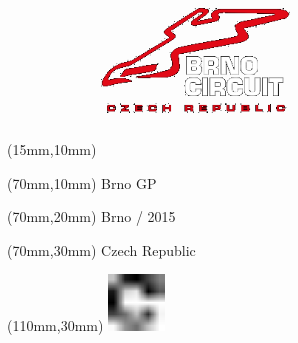 \null\newpage
\begin{textblock*}{50mm}(15mm,10mm)%
\includegraphics[width=50mm]{LG/BRN.png}
\end{textblock*}
\begin{textblock*}{130mm}(70mm,10mm)%
{\fontsize{20}{20}\selectfont Brno GP}\\
\end{textblock*}
\begin{textblock*}{120mm}(70mm,20mm)%
{\fontsize{16}{16}\selectfont Brno / 2015}\\
\end{textblock*}
\begin{textblock*}{120mm}(70mm,30mm)%
{\fontsize{12}{12}\selectfont Czech Republic}
\end{textblock*}
\begin{textblock*}{30mm}(110mm,30mm)%
\centering
\includegraphics[height=15mm]{icons/fa-rotate-right.pdf}
\end{textblock*}
